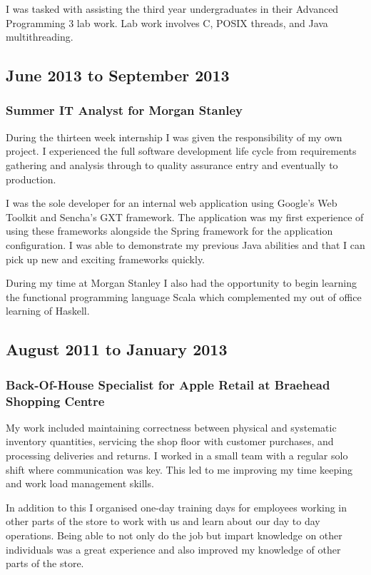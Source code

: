 \documentclass[11pt,a4paper]{article}
\begin{document}
I was tasked with assisting the third year undergraduates in their Advanced
Programming 3 lab work. Lab work involves C, POSIX threads, and Java
multithreading.

\subsection*{June 2013 to September 2013}

\subsubsection*{Summer IT Analyst for Morgan Stanley}

During the thirteen week internship I was given the responsibility of my own
project. I experienced the full software development life cycle from
requirements gathering and analysis through to quality assurance entry and
eventually to production.

I was the sole developer for an internal web application using Google's Web
Toolkit and Sencha's GXT framework. The application was my first experience of
using these frameworks alongside the Spring framework for the application
configuration. I was able to demonstrate my previous Java abilities and that I
can pick up new and exciting frameworks quickly.

During my time at Morgan Stanley I also had the opportunity to begin learning
the functional programming language Scala which complemented my out of office
learning of Haskell.

\subsection*{August 2011 to January 2013}

\subsubsection*{Back-Of-House Specialist for Apple Retail at Braehead Shopping Centre}

My work included maintaining correctness between physical and systematic
inventory quantities, servicing the shop floor with customer purchases, and
processing deliveries and returns. I worked in a small team with a regular solo
shift where communication was key. This led to me improving my time keeping and
work load management skills.

In addition to this I organised one-day training days for employees working in
other parts of the store to work with us and learn about our day to day
operations. Being able to not only do the job but impart knowledge on other
individuals was a great experience and also improved my knowledge of other parts
of the store.
\end{document}
